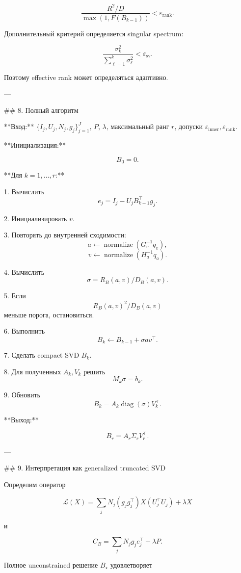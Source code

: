 \[
\frac{R^2/D}
     {\max(1,F(B_{k-1}))}
<
\varepsilon_{\mathrm{rank}}.
\]

Дополнительный критерий определяется singular spectrum:

\[
\frac{\sigma_k^2}
{\sum_{\ell=1}^{k}\sigma_\ell^2}
<
\varepsilon_{\mathrm{sv}}.
\]

Поэтому effective rank может определяться адаптивно.

---

## 8. Полный алгоритм

**Вход:**  
\(\{I_j,U_j,N_j,g_j\}_{j=1}^J\), \(P\), \(\lambda\), максимальный ранг \(r\), допуски \(\varepsilon_{\mathrm{inner}},\varepsilon_{\mathrm{rank}}\).

**Инициализация:**

\[
B_0=0.
\]

**Для \(k=1,\ldots,r\):**

1. Вычислить
   \[
   e_j=I_j-U_jB_{k-1}^\top g_j.
   \]

2. Инициализировать \(v\).

3. Повторять до внутренней сходимости:
   \[
   a\leftarrow
   \operatorname{normalize}(G_v^{-1}q_v),
   \]
   \[
   v\leftarrow
   \operatorname{normalize}(H_a^{-1}q_a).
   \]

4. Вычислить
   \[
   \sigma=R_B(a,v)/D_B(a,v).
   \]

5. Если
   \[
   R_B(a,v)^2/D_B(a,v)
   \]
   меньше порога, остановиться.

6. Выполнить
   \[
   B_k\leftarrow B_{k-1}+\sigma av^\top.
   \]

7. Сделать compact SVD \(B_k\).

8. Для полученных \(A_k,V_k\) решить
   \[
   M_k\sigma=b_k.
   \]

9. Обновить
   \[
   B_k=A_k\operatorname{diag}(\sigma)V_k^\top.
   \]

**Выход:**

\[
\boxed{
B_r=A_r\Sigma_rV_r^\top.
}
\]

---

## 9. Интерпретация как generalized truncated SVD

Определим оператор

\[
\boxed{
\mathcal L(X)
=
\sum_j
N_j
(g_jg_j^\top)
X
(U_j^\top U_j)
+
\lambda X
}
\]

и

\[
\boxed{
C_B
=
\sum_j
N_jg_jc_j^\top+\lambda P.
}
\]

Полное unconstrained решение \(B_\star\) удовлетворяет

